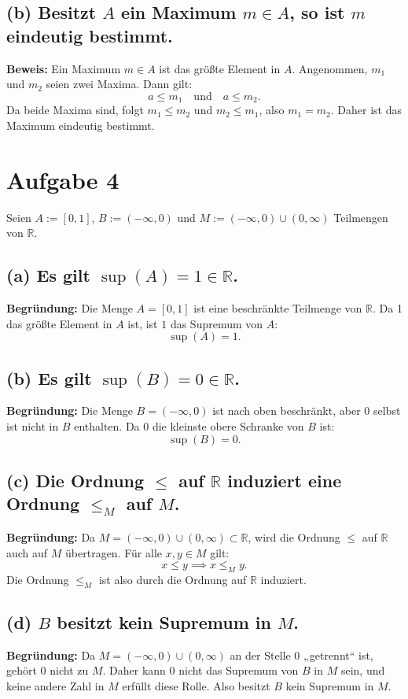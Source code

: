\documentclass[11pt]{article}
\begin{document}
\subsection*{(b) Besitzt \( A \) ein Maximum \( m \in A \), so ist \( m \) eindeutig bestimmt.}

\textbf{Beweis:} Ein Maximum \( m \in A \) ist das größte Element in \( A \). Angenommen, \( m_1 \) und \( m_2 \) seien zwei Maxima. Dann gilt:
\[
a \leq m_1 \quad \text{und} \quad a \leq m_2.
\]
Da beide Maxima sind, folgt \( m_1 \leq m_2 \) und \( m_2 \leq m_1 \), also \( m_1 = m_2 \). Daher ist das Maximum eindeutig bestimmt.

\section*{Aufgabe 4}

Seien \( A := [0,1] \), \( B := (-\infty, 0) \) und \( M := (-\infty, 0) \cup (0, \infty) \) Teilmengen von \( \mathbb{R} \).

\subsection*{(a) Es gilt \( \sup(A) = 1 \in \mathbb{R} \).}

\textbf{Begründung:} Die Menge \( A = [0,1] \) ist eine beschränkte Teilmenge von \( \mathbb{R} \). Da 1 das größte Element in \( A \) ist, ist \( 1 \) das Supremum von \( A \):
\[
\sup(A) = 1.
\]

\subsection*{(b) Es gilt \( \sup(B) = 0 \in \mathbb{R} \).}

\textbf{Begründung:} Die Menge \( B = (-\infty, 0) \) ist nach oben beschränkt, aber 0 selbst ist nicht in \( B \) enthalten. Da 0 die kleinste obere Schranke von \( B \) ist:
\[
\sup(B) = 0.
\]

\subsection*{(c) Die Ordnung \( \leq \) auf \( \mathbb{R} \) induziert eine Ordnung \( \leq_M \) auf \( M \).}

\textbf{Begründung:} Da \( M = (-\infty, 0) \cup (0, \infty) \subset \mathbb{R} \), wird die Ordnung \( \leq \) auf \( \mathbb{R} \) auch auf \( M \) übertragen. Für alle \( x, y \in M \) gilt:
\[
x \leq y \implies x \leq_M y.
\]
Die Ordnung \( \leq_M \) ist also durch die Ordnung auf \( \mathbb{R} \) induziert.

\subsection*{(d) \( B \) besitzt kein Supremum in \( M \).}

\textbf{Begründung:} Da \( M = (-\infty, 0) \cup (0, \infty) \) an der Stelle \( 0 \) „getrennt“ ist, gehört 0 nicht zu \( M \). Daher kann 0 nicht das Supremum von \( B \) in \( M \) sein, und keine andere Zahl in \( M \) erfüllt diese Rolle. Also besitzt \( B \) kein Supremum in \( M \).
\end{document}
